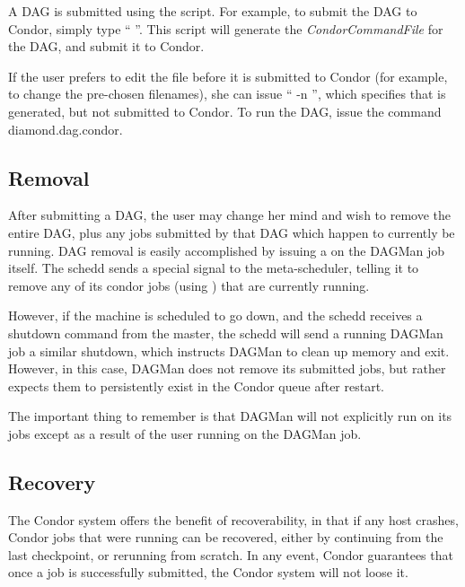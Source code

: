 A DAG is submitted using the  script.  For example, to
submit the  DAG to Condor, simply type
`` ''.  This script will generate the
 \textit{CondorCommandFile} for the DAG, and submit
it to Condor.

If the user prefers to edit the  file before it is
submitted to Condor (for example, to change the pre-chosen filenames), she can
issue `` -n '', which specifies that
 is generated, but not submitted to Condor.  To run
the DAG, issue the command  diamond.dag.condor.

\subsection{Removal}

After submitting a DAG, the user may change her mind and wish to remove the
entire DAG, plus any jobs submitted by that DAG which happen to currently be
running.  DAG removal is easily accomplished by issuing a  on the
DAGMan job itself.  The schedd sends a special signal to the meta-scheduler,
telling it to remove any of its condor jobs (using ) that are
currently running.

However, if the machine is scheduled to go down, and the schedd receives a
shutdown command from the master, the schedd will send a running DAGMan job a
similar shutdown, which instructs DAGMan to clean up memory and exit.
However, in this case, DAGMan does not remove its submitted jobs, but rather
expects them to persistently exist in the Condor queue after restart.

The important thing to remember is that DAGMan will not explicitly run
 on its jobs except as a result of the user running  on
the DAGMan job.

\subsection{Recovery}

The Condor system offers the benefit of recoverability, in that if any host
crashes, Condor jobs that were running can be recovered, either by continuing
from the last checkpoint, or rerunning from scratch.  In any event, Condor
guarantees that once a job is successfully submitted, the Condor system will
not loose it.

